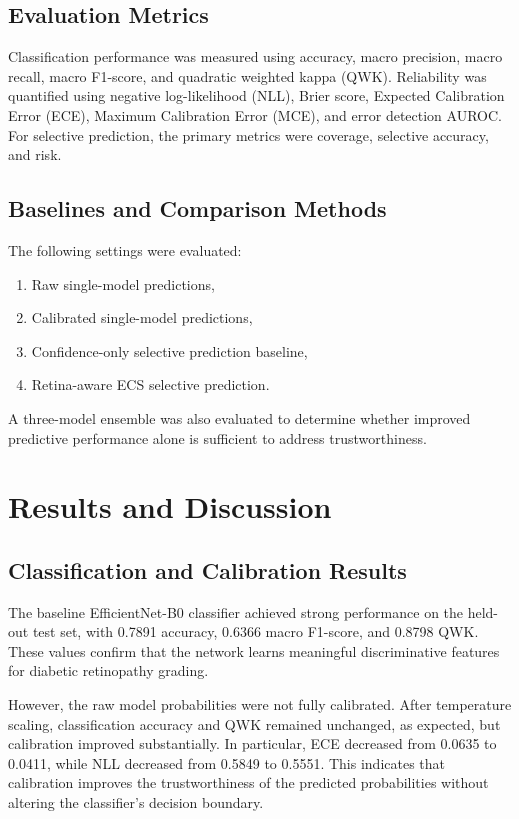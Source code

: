 \documentclass[conference]{IEEEtran}
\begin{document}
\subsection{Evaluation Metrics}
Classification performance was measured using accuracy, macro precision, macro recall, macro F1-score, and quadratic weighted kappa (QWK). Reliability was quantified using negative log-likelihood (NLL), Brier score, Expected Calibration Error (ECE), Maximum Calibration Error (MCE), and error detection AUROC. For selective prediction, the primary metrics were coverage, selective accuracy, and risk.

\subsection{Baselines and Comparison Methods}
The following settings were evaluated:
\begin{enumerate}
    \item Raw single-model predictions,
    \item Calibrated single-model predictions,
    \item Confidence-only selective prediction baseline,
    \item Retina-aware ECS selective prediction.
\end{enumerate}

A three-model ensemble was also evaluated to determine whether improved predictive performance alone is sufficient to address trustworthiness.

\section{Results and Discussion}

\subsection{Classification and Calibration Results}
The baseline EfficientNet-B0 classifier achieved strong performance on the held-out test set, with 0.7891 accuracy, 0.6366 macro F1-score, and 0.8798 QWK. These values confirm that the network learns meaningful discriminative features for diabetic retinopathy grading.

However, the raw model probabilities were not fully calibrated. After temperature scaling, classification accuracy and QWK remained unchanged, as expected, but calibration improved substantially. In particular, ECE decreased from 0.0635 to 0.0411, while NLL decreased from 0.5849 to 0.5551. This indicates that calibration improves the trustworthiness of the predicted probabilities without altering the classifier’s decision boundary.
\end{document}
